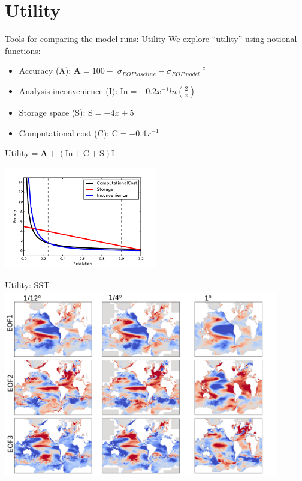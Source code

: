 \documentclass{beamer}
\begin{document}
\section{Utility}
\begin{frame}{Tools for comparing the model runs: Utility}
We explore ``utility'' using notional functions:
 \begin{itemize}
  \item Accuracy (A):                     $\mathrm{\mathbf{A}} = 100 - |\sigma_{EOFbaseline}-\sigma_{EOFmodel}|^{c}$
  \item Analysis inconvenience (I): 	$\mathrm{In} = -0.2x^{-1}ln\left(\frac{2}{x}\right)$
  \item Storage space (S):			 $\mathrm{S} = -4x+5$
  \item Computational cost (C):               		$\mathrm{C} = -0.4x^{-1}$
 \end{itemize}
\begin{alertblock}{}
 \centering $\mathrm{Utility} = \mathrm{\mathbf{A}} + \left( \mathrm{In} + \mathrm{C} + \mathrm{S}\right)\mathrm{I}$
\end{alertblock}
\centering \includegraphics[width=0.5\textwidth]{elementsOfUtility.pdf}
\end{frame}

\begin{frame}{Utility: SST}
\vspace{-0.5cm}
\centering \includegraphics[width=0.9\textwidth]{SSTUtility_1_2_3_P.png}
\end{frame}
\end{document}
